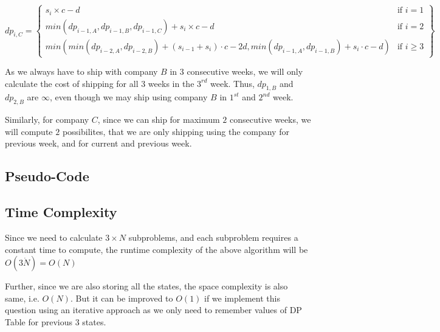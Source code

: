 \documentclass{article}
\begin{document}
\begin{equation}
dp_{i, C} = 
\left\{
    \begin{array}{lr}
        s_i \times c - d & \text{if } i = 1\\
        min(dp_{i - 1, A}, dp_{i - 1, B}, dp_{i - 1, C}) + s_i \times c - d & \text{if } i = 2\\
        min(min(dp_{i - 2, A}, dp_{i - 2, B}) + (s_{i - 1} + s_i) \cdot c - 2d, min(dp_{i - 1, A}, dp_{i - 1, B}) + s_i \cdot c - d) & \text{if } i\geq 3
    \end{array}
\right\}
\end{equation}

As we always have to ship with company $B$ in $3$ consecutive weeks, we will only calculate the cost of shipping for all $3$ weeks in the $3^{rd}$ week. Thus, $dp_{1, B}$ and $dp_{2, B}$ are $\infty$, even though we may ship using company $B$ in $1^{st}$ and $2^{nd}$ week.

Similarly, for company $C$, since we can ship for maximum $2$ consecutive weeks, we will compute $2$ possibilites, that we are only shipping using the company for previous week, and for current and previous week.

\subsection{Pseudo-Code}

\begin{algorithmic}[1]

\State {}
\EndIf

\State {}
\Else
\State {}
\EndIf
{}
\State \Return{$\infty$}
\State {}
\Else
\State {}
\EndIf
{}
\State {}
\State {}
\Else
\State {}
\EndIf
\Endif
\EndIf
\EndProcedure
\end{algorithmic}

\subsection{Time Complexity}

Since we need to calculate $3 \times N$ subproblems, and each subproblem requires a constant time to compute, the runtime complexity of the above algorithm will be $O(3 \dot N) = O(N)$

Further, since we are also storing all the states, the space complexity is also same, i.e. $O(N)$. But it can be improved to $O(1)$ if we implement this question using an iterative approach as we only need to remember values of DP Table for previous $3$ states.
\end{document}
